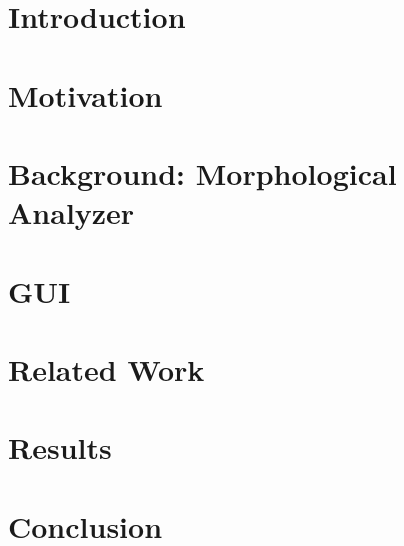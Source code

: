 

\section{Introduction}
\label{sec:introduction}


\section{Motivation}
\label{sec:motivation}


\section{Background: Morphological Analyzer}
\label{sec:morph}


\section{\framework}
\label{sec:framework}


\section{\framework GUI}
\label{sec:gui}


\section{Related Work}
\label{sec:related}


\section{Results}
\label{sec:results}


\section{Conclusion}
\label{sec:conclusion}



{\tiny }


